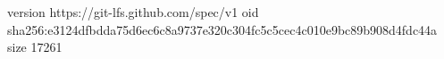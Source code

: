version https://git-lfs.github.com/spec/v1
oid sha256:e3124dfbdda75d6ec6c8a9737e320c304fc5c5cec4c010e9bc89b908d4fdc44a
size 17261
